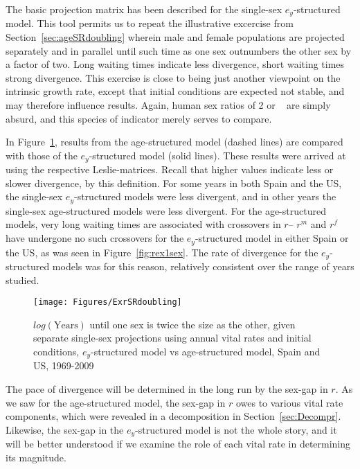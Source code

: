  \FloatBarrier
 \label{sex:doublingex}
The basic projection matrix has been described for the single-sex
$e_y$-structured model. This tool permits us to repeat the illustrative
excercise from Section~\ref{sec:ageSRdoubling} wherein male and female populations are
projected separately and in parallel until such time as one sex outnumbers the
other sex by a factor of two. Long waiting times indicate less divergence, short
waiting times strong divergence. This exercise is close to being just another
viewpoint on the intrinsic growth rate, except that initial conditions are
expected not stable, and may therefore influence results. Again,
human sex ratios of 2 or \textonehalf~ are simply absurd, and this species of
indicator merely serves to compare.

In Figure~\ref{fig:exSRdoubling}, results from the age-structured model (dashed
lines) are compared with those of the $e_y$-structured model (solid lines).
These results were arrived at using the respective Leslie-matrices. Recall that
higher values indicate less or slower divergence, by this definition. For some 
years in both Spain and the US, the single-sex $e_y$-structured models were less 
divergent, and in other years the single-sex age-structured models were less divergent.
 For the age-structured models, very long waiting times are associated
with crossovers in $r$-- $r^m$ and $r^f$ have undergone no such crossovers for
the $e_y$-structured model in either Spain or the US, as was seen in
Figure~\ref{fig:rex1sex}. The rate of divergence for the $e_y$-structured models
was for this reason, relatively consistent over the range of years studied. 

\begin{figure}[ht!]
        \centering  
          \caption{$log(\mathrm{Years})$ until one sex is twice the size as the
          other, given separate single-sex projections using annual vital rates and initial
          conditions, $e_y$-structured model vs age-structured model, Spain
          and US, 1969-2009}
           \texttt{[image: Figures/ExrSRdoubling]}
          \label{fig:exSRdoubling}
\end{figure}

The pace of divergence will be determined in the long run by the sex-gap in $r$.
As we saw for the age-structured model, the sex-gap in $r$ owes to various vital
rate components, which were revealed in a decomposition in
Section~\ref{sec:Decompr}. Likewise, the sex-gap in the $e_y$-structured model
is not the whole story, and it will be better understood if we examine the role
of each vital rate in determining its magnitude.

 \FloatBarrier